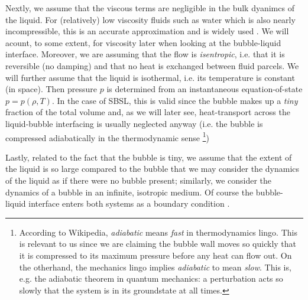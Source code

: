 \documentclass[rmp,aps,nofootinbib,superscriptaddress,floatfix,10pt]{revtex4-2}
\begin{document}
Nextly, we assume that the viscous terms are negligible in the bulk dyanimcs of the liquid. For (relatively) low viscosity fluids such as water which is also nearly incompressible, this is an accurate approximation and is widely used \cite{prosperetti1986bubble,prosperetti1999old,brenner2002single,plesset1977bubble}.  We will acount, to some extent, for viscosity later when looking at the bubble-liquid interface. Moreover, we are assuming that the flow is \emph{isentropic}, i.e. that it is reversible (no damping) and that no heat is exchanged between fluid parcels. We will further assume that the liquid is isothermal, i.e. its temperature is constant (in space). Then pressure $p$ is determined from an instantaneous equation-of-state $p=p(\rho,T)$. In the case of SBSL, this is valid since the bubble makes up a \emph{tiny} fraction of the total volume and, as we will later see, heat-transport across the liquid-bubble interfacing is usually neglected anyway (i.e. the bubble is compressed adiabatically in the thermodynamic sense \footnote{According to Wikipedia, \emph{adiabatic} means \emph{fast} in thermodynamics lingo. This is relevant to us since we are claiming the bubble wall moves so quickly that it is compressed to its maximum pressure before any heat can flow out. On the otherhand, the mechanics lingo implies \emph{adiabatic} to mean \emph{slow}. This is, e.g. the adiabatic theorem in quantum mechanics: a perturbation acts so slowly that the system is in its groundstate at all times.})

Lastly, related to the fact that the bubble is tiny, we assume that the extent of the liquid is so large compared to the bubble that we may consider the dynamics of the liquid as if there were no bubble present; similarly, we consider the dynamics of a bubble in an infinite, isotropic medium. Of course the bubble-liquid interface enters both systems as a boundary condition \cite{prosperetti1986bubble}. 
\end{document}
